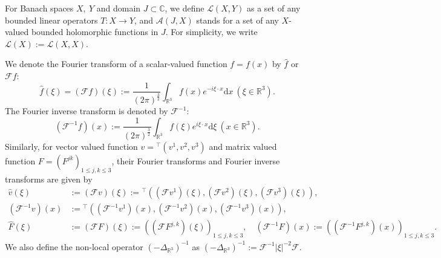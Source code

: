 \documentclass[dvipdfmx,12pt]{article}
\begin{document}
For Banach spaces $X,~Y$ and domain $J\subset \mathbb{C}$, we define $\mathcal{L}(X,Y)$ as a set of any bounded linear operators $T:X\to Y$, and $\mathcal{A}(J,X)$ stands for a set of any $X$-valued bounded holomorphic functions in $J$. For simplicity, we write $\mathcal{L}(X):=\mathcal{L}(X,X)$.


We denote the Fourier transform of a scalar-valued function $f=f(x)$ by $\widehat{f}$ or $\mathcal{F}f$:
\[
\widehat{f}(\xi)=(\mathcal{F}f)(\xi):=\frac{1}{(2\pi)^{\frac{3}{2}}}\int_{\mathbb{R}^3} f(x)e^{-i\xi\cdot x} \mathrm{d}x~(\xi\in\mathbb{R}^3).
\] 
The Fourier inverse transform is denoted by $\mathcal{F}^{-1}$:
\[
(\mathcal{F}^{-1}f)(x):=\frac{1}{(2\pi)^{\frac{3}{2}}}\int_{\mathbb{R}^3} f(\xi)e^{i\xi\cdot x} \mathrm{d}\xi~(x\in\mathbb{R}^3).
\] 
Similarly, for vector valued function $v={}^\top(v^1,v^2,v^3)$ and matrix valued function $F=(F^{jk})_{1\le j,k\le 3}$, their Fourier transforms and Fourier inverse transforms are given by 
\begin{align*}
\widehat{v}(\xi)&:=(\mathcal{F}v)(\xi):={}^\top((\mathcal{F}v^1)(\xi),(\mathcal{F}v^2)(\xi),(\mathcal{F}v^3)(\xi)),\\
(\mathcal{F}^{-1}v)(x)&:={}^\top((\mathcal{F}^{-1}v^1)(x),(\mathcal{F}^{-1}v^2)(x),(\mathcal{F}^{-1}v^3)(x)), \\
\widehat{F}(\xi)&:=(\mathcal{F}F)(\xi):=((\mathcal{F}F^{j,k})(\xi))_{1\le j,k\le 3}, \quad
(\mathcal{F}^{-1}F)(x):=((\mathcal{F}^{-1}F^{j,k})(x))_{1\le j,k\le 3}.
\end{align*}
We also define the non-local operator $(-\Delta_{\mathbb{R}^3})^{-1}$ as $(-\Delta_{\mathbb{R}^3})^{-1}:=\mathcal{F}^{-1}|\xi|^{-2}\mathcal{F}$.
\end{document}
